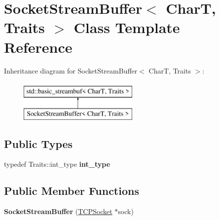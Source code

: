 \hypertarget{class_socket_stream_buffer}{}\section{Socket\+Stream\+Buffer$<$ CharT, Traits $>$ Class Template Reference}
\label{class_socket_stream_buffer}
Inheritance diagram for Socket\+Stream\+Buffer$<$ CharT, Traits $>$\+:\begin{figure}[H]
\begin{center}
\leavevmode
\includegraphics[height=2.000000cm]{class_socket_stream_buffer}
\end{center}
\end{figure}
\subsection*{Public Types}
\begin{DoxyCompactItemize}
\item 
typedef Traits\+::int\+\_\+type {\bfseries int\+\_\+type}\hypertarget{class_socket_stream_buffer_a7aa4d7b78c1022d892160cbb753aacba}{}\label{class_socket_stream_buffer_a7aa4d7b78c1022d892160cbb753aacba}

\end{DoxyCompactItemize}
\subsection*{Public Member Functions}
\begin{DoxyCompactItemize}
\item 
{\bfseries Socket\+Stream\+Buffer} (\hyperlink{class_t_c_p_socket}{T\+C\+P\+Socket} $\ast$sock)\hypertarget{class_socket_stream_buffer_ab21607e9f4ae12188ddf1354a72de3fc}{}\label{class_socket_stream_buffer_ab21607e9f4ae12188ddf1354a72de3fc}

\end{DoxyCompactItemize}
